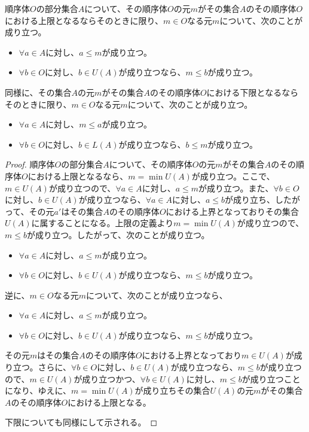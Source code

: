 \documentclass[dvipdfmx]{jsarticle}
\begin{document}
\begin{thm}\label{4.1.1.11}
順序体$O$の部分集合$A$について、その順序体$O$の元$m$がその集合$A$のその順序体$O$における上限となるならそのときに限り、$m \in O$なる元$m$について、次のことが成り立つ。
\begin{itemize}
\item
  $\forall a \in A$に対し、$a \leq m$が成り立つ。
\item
  $\forall b \in O$に対し、$b \in U(A)$が成り立つなら、$m \leq b$が成り立つ。
\end{itemize}\par
同様に、その集合$A$の元$m$がその集合$A$のその順序体$O$における下限となるならそのときに限り、$m \in O$なる元$m$について、次のことが成り立つ。
\begin{itemize}
\item
  $\forall a \in A$に対し、$m \leq a$が成り立つ。
\item
  $\forall b \in O$に対し、$b \in L(A)$が成り立つなら、$b \leq m$が成り立つ。
\end{itemize}
\end{thm}
\begin{proof}
順序体$O$の部分集合$A$について、その順序体$O$の元$m$がその集合$A$のその順序体$O$における上限となるなら、$m = \min{U(A)}$が成り立つ。ここで、$m \in U(A)$が成り立つので、$\forall a \in A$に対し、$a \leq m$が成り立つ。また、$\forall b \in O$に対し、$b \in U(A)$が成り立つなら、$\forall a \in A$に対し、$a \leq b$が成り立ち、したがって、その元$a'$はその集合$A$のその順序体$O$における上界となっておりその集合$U(A)$に属することになる。上限の定義より$m = \min{U(A)}$が成り立つので、$m \leq b$が成り立つ。したがって、次のことが成り立つ。
\begin{itemize}
\item
  $\forall a \in A$に対し、$a \leq m$が成り立つ。
\item
  $\forall b \in O$に対し、$b \in U(A)$が成り立つなら、$m \leq b$が成り立つ。
\end{itemize}\par
逆に、$m \in O$なる元$m$について、次のことが成り立つなら、
\begin{itemize}
\item
  $\forall a \in A$に対し、$a \leq m$が成り立つ。
\item
  $\forall b \in O$に対し、$b \in U(A)$が成り立つなら、$m \leq b$が成り立つ。
\end{itemize}
その元$m$はその集合$A$のその順序体$O$における上界となっており$m \in U(A)$が成り立つ。さらに、$\forall b \in O$に対し、$b \in U(A)$が成り立つなら、$m \leq b$が成り立つので、$m \in U(A)$が成り立つかつ、$\forall b \in U(A)$に対し、$m \leq b$が成り立つことになり、ゆえに、$m = \min{U(A)}$が成り立ちその集合$U(A)$の元$m$がその集合$A$のその順序体$O$における上限となる。\par
下限についても同様にして示される。
\end{proof}
\end{document}
